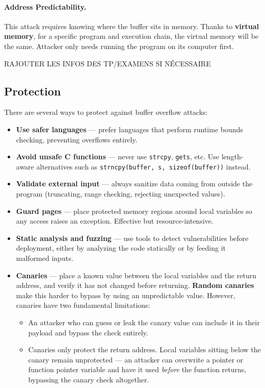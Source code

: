 \paragraph{Address Predictability.}
This attack requires knowing where the buffer sits in memory. Thanks to \textbf{virtual memory}, for a specific program and execution chain, the virtual memory will be the same. Attacker only needs running the program on its computer first.

RAJOUTER LES INFOS DES TP/EXAMENS SI NÉCESSAIRE

\subsection{Protection}
There are several ways to protect against buffer overflow attacks:

\begin{itemize}
    \item \textbf{Use safer languages} — prefer languages that perform runtime bounds checking, preventing overflows entirely.

    \item \textbf{Avoid unsafe C functions} — never use \texttt{strcpy}, \texttt{gets}, etc. Use length-aware alternatives such as \texttt{strncpy(buffer, s, sizeof(buffer))} instead.

    \item \textbf{Validate external input} — always sanitize data coming from outside the program (truncating, range checking, rejecting unexpected values).

    \item \textbf{Guard pages} — place protected memory regions around local variables so any access raises an exception. Effective but resource-intensive.

    \item \textbf{Static analysis and fuzzing} — use tools to detect vulnerabilities before deployment, either by analyzing the code statically or by feeding it malformed inputs.

    \item \textbf{Canaries} — place a known value between the local variables and the return address, and verify it has not changed before returning. \textbf{Random canaries} make this harder to bypass by using an unpredictable value. However, canaries have two fundamental limitations:
    \begin{itemize}
        \item An attacker who can guess or leak the canary value can include it in their payload and bypass the check entirely.
        \item Canaries only protect the return address. Local variables sitting below the canary remain unprotected — an attacker can overwrite a pointer or function pointer variable and have it used \emph{before} the function returns, bypassing the canary check altogether.
    \end{itemize}


\end{itemize}
